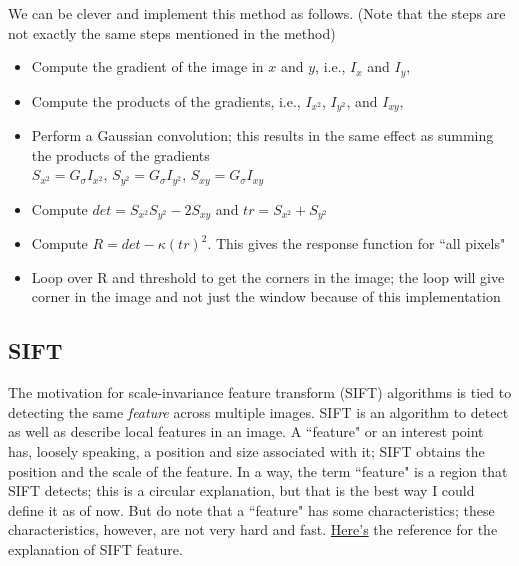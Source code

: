 \documentclass{report}
\begin{document}
We can be clever and implement this method as follows. (Note that the steps are not exactly the same steps mentioned in the method)
\begin{itemize}
	\item Compute the gradient of the image in $x$ and $y$, i.e., $I_{x}$ and $I_{y}$,
	\item Compute the products of the gradients, i.e., $I_{x^2}$, $I_{y^2}$, and $I_{xy}$,
	\item Perform a Gaussian convolution; this results in the same effect as summing the products of the gradients\\
		$S_{x^2}= G_{\sigma} I_{x^2}$, $S_{y^2}= G_{\sigma} I_{y^2}$, $S_{xy}= G_{\sigma} I_{xy}$
	\item Compute $det = S_{x^2} S_{y^2} - 2 S_{xy}$ and $tr = S_{x^2} + S_{y^2}$
	\item Compute $R = det - \kappa (tr)^2$. This gives the response function for ``all pixels"
	\item Loop over R and threshold to get the corners in the image; the loop will give corner in the image and not just the window because of this implementation
\end{itemize}

\subsection{SIFT}
\hspace{\parindent}The motivation for scale-invariance feature transform (SIFT) algorithms is tied to detecting the same \textit{feature} across multiple images. SIFT is an algorithm to detect as well as describe local features in an image. A ``feature" or an interest point has, loosely speaking, a position and size associated with it; SIFT obtains the position and the scale of the feature. In a way, the term ``feature" is a region that SIFT detects; this is a circular explanation, but that is the best way I could define it as of now. But do note that a ``feature" has some characteristics; these characteristics, however, are not very hard and fast. \href{https://homepages.inf.ed.ac.uk/rbf/CVonline/LOCAL_COPIES/AV0405/MURRAY/SIFT.html}{Here's} the reference for the explanation of SIFT feature.
\end{document}
